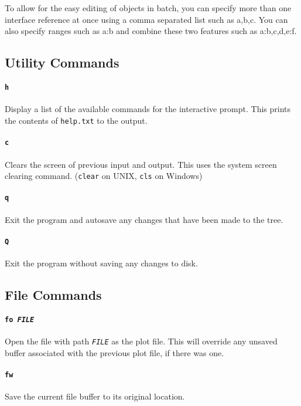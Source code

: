 \documentclass[a4paper]{article}
\begin{document}
To allow for the easy editing of objects in batch, you can specify more than 
one interface reference at once using a comma separated list such as a,b,c. 
You can also specify ranges such as a:b and combine these two features such 
as a:b,c,d,e:f.

\subsection{Utility Commands}

\paragraph{\texttt{h}}
Display a list of the available commands for the interactive prompt. This 
prints the contents of \texttt{help.txt}  to the output.

\paragraph{\texttt{c}}
Clears the screen of previous input and output. This uses the system screen 
clearing command. (\texttt{clear} on UNIX, \texttt{cls} on Windows)

\paragraph{\texttt{q}}
Exit the program and autosave any changes that have been made to the tree.

\paragraph{\texttt{Q}}
Exit the program without saving any changes to disk.

\subsection{File Commands}

\paragraph{\texttt{fo \textit{FILE}}}
Open the file with path \texttt{\textit{FILE}} as the plot file. This will 
override any unsaved buffer associated with the previous plot file, if 
there was one.

\paragraph{\texttt{fw}}
Save the current file buffer to its original location.
\end{document}

